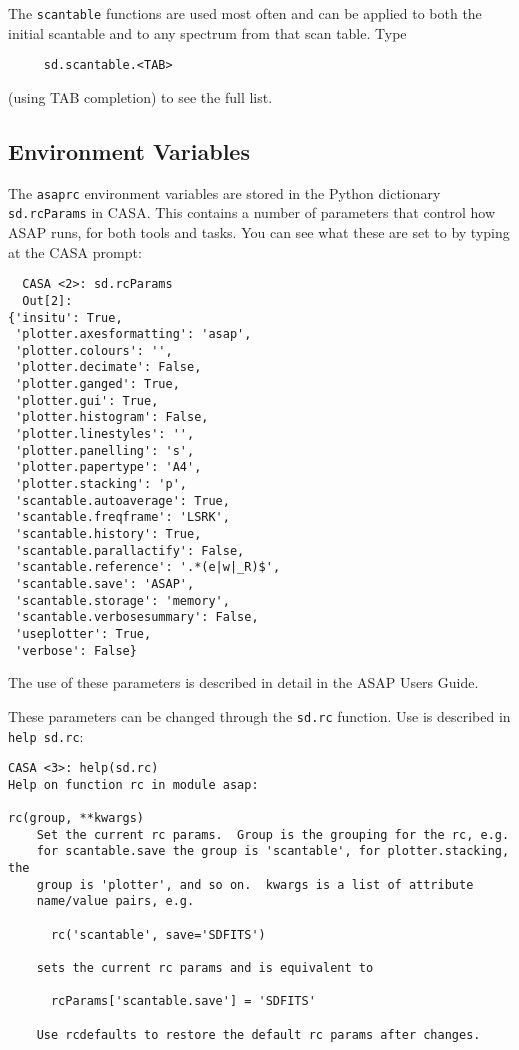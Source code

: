 The {\tt scantable} functions are used most often and can be applied
to both the initial scantable and to any spectrum from that scan
table.  Type
\small
\begin{verbatim}
     sd.scantable.<TAB>
\end{verbatim}
\normalsize
(using TAB completion) to see the full list. 


\subsection{Environment Variables}
\label{subsection:sd.asap.environ}

The {\tt asaprc} environment variables are stored in the Python
dictionary {\tt sd.rcParams} in CASA.  This contains a number
of parameters that control how ASAP runs, for both tools and
tasks.  You can see what these are set to by typing at the
CASA prompt:

\small
\begin{verbatim}
  CASA <2>: sd.rcParams
  Out[2]: 
{'insitu': True,
 'plotter.axesformatting': 'asap',
 'plotter.colours': '',
 'plotter.decimate': False,
 'plotter.ganged': True,
 'plotter.gui': True,
 'plotter.histogram': False,
 'plotter.linestyles': '',
 'plotter.panelling': 's',
 'plotter.papertype': 'A4',
 'plotter.stacking': 'p',
 'scantable.autoaverage': True,
 'scantable.freqframe': 'LSRK',
 'scantable.history': True,
 'scantable.parallactify': False,
 'scantable.reference': '.*(e|w|_R)$',
 'scantable.save': 'ASAP',
 'scantable.storage': 'memory',
 'scantable.verbosesummary': False,
 'useplotter': True,
 'verbose': False}
\end{verbatim}
\normalsize

The use of these parameters is described in detail in the
ASAP Users Guide.

These parameters can be changed through the {\tt sd.rc}
function.  Use is described in {\tt help sd.rc}:

\small
\begin{verbatim}
CASA <3>: help(sd.rc)
Help on function rc in module asap:

rc(group, **kwargs)
    Set the current rc params.  Group is the grouping for the rc, e.g.
    for scantable.save the group is 'scantable', for plotter.stacking, the
    group is 'plotter', and so on.  kwargs is a list of attribute
    name/value pairs, e.g.
    
      rc('scantable', save='SDFITS')
    
    sets the current rc params and is equivalent to
    
      rcParams['scantable.save'] = 'SDFITS'
    
    Use rcdefaults to restore the default rc params after changes.
\end{verbatim}
\normalsize

